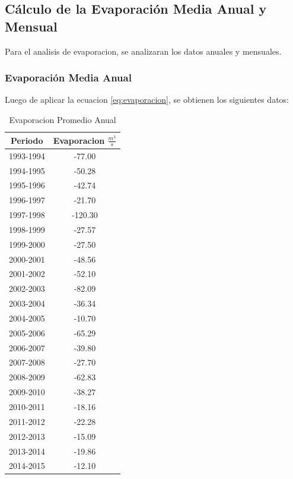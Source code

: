 \documentclass{article} %
\begin{document}
\subsection{Cálculo de la Evaporación Media Anual y Mensual}

Para el analisis de evaporacion, se analizaran los datos anuales y mensuales.

\subsubsection{Evaporación Media Anual}

Luego de aplicar la ecuacion \ref{eq:evaporacion}, se obtienen los siguientes datos:

\begin{table}[ht]
    \centering
    \caption{Evaporacion Promedio Anual}
    \vspace{0.2cm}
    \begin{tabular}{|c|c|}
        \hline
        \textbf{Periodo} & \textbf{Evaporacion $\frac{m^3}{s}$} \\
        \hline
        1993-1994 & -77.00 \\
        1994-1995 & -50.28 \\
        1995-1996 & -42.74 \\
        1996-1997 & -21.70 \\
        1997-1998 & -120.30 \\
        1998-1999 & -27.57 \\
        1999-2000 & -27.50 \\
        2000-2001 & -48.56 \\
        2001-2002 & -52.10 \\
        2002-2003 & -82.09 \\
        2003-2004 & -36.34 \\
        2004-2005 & -10.70 \\
        2005-2006 & -65.29 \\
        2006-2007 & -39.80 \\
        2007-2008 & -27.70 \\
        2008-2009 & -62.83 \\
        2009-2010 & -38.27 \\
        2010-2011 & -18.16 \\
        2011-2012 & -22.28 \\
        2012-2013 & -15.09 \\
        2013-2014 & -19.86 \\
        2014-2015 & -12.10 \\

\end{tabular}
\end{table}
\end{document}
